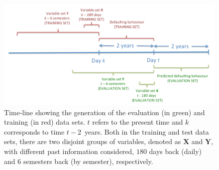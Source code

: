 \documentclass{article}
\theoremstyle{theorem}
\theoremstyle{definition}
\newcommand{\X}{\mathbf{X}}
\newcommand{\Y}{\mathbf{Y}}
\begin{document}
\begin{figure}[ht!]
\centering
\includegraphics[scale=0.45]{figures/CajaMarTimeLine}
\caption{\label{Figure:CajaMarTimeLine}Time-line showing the generation of the evaluation (in green) and training (in red) data sets. $t$ refers to the present time and $k$ corresponds to time $t-2$\ years. Both in the training and test data sets, there are two disjoint groups of variables, denoted as $\X$ and $\Y$, with different past information considered, $180$ days back (daily) and $6$ semesters back (by semester), respectively.}

\end{figure}
\end{document}
